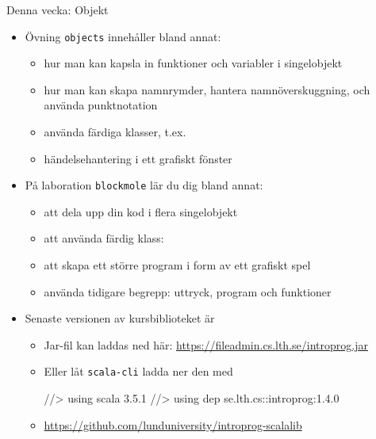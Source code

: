 
\ifkompendium\else
\begin{SlideExtra}{Denna vecka: Objekt}
\begin{itemize}\SlideFontSmall
\item Övning \texttt{objects} innehåller bland annat:
\begin{itemize}\SlideFontTiny
\item hur man kan kapsla in funktioner och variabler i singelobjekt
\item hur man kan skapa namnrymder, hantera namnöverskuggning, och använda punktnotation
\item använda färdiga klasser, t.ex. 
\item händelsehantering i ett grafiskt fönster
\end{itemize}

\item På laboration \texttt{blockmole} lär du dig bland annat:
\begin{itemize}\SlideFontTiny
  \item att dela upp din kod i flera singelobjekt
  \item att använda färdig klass: 
  \item att skapa ett större program i form av ett grafiskt spel
  \item använda tidigare begrepp: uttryck, program och funktioner
\end{itemize}

\item Senaste versionen av kursbiblioteket  är \Emph{\LibVersion} 
\begin{itemize}\SlideFontTiny
\item Jar-fil kan laddas ned här: \url{https://fileadmin.cs.lth.se/introprog.jar}
\item Eller låt \texttt{scala-cli} ladda ner den med
\begin{Code}
//> using scala 3.5.1
//> using dep se.lth.cs::introprog:1.4.0  
\end{Code} 
\item \url{https://github.com/lunduniversity/introprog-scalalib}
\end{itemize}
\end{itemize}
\end{SlideExtra}
\fi


